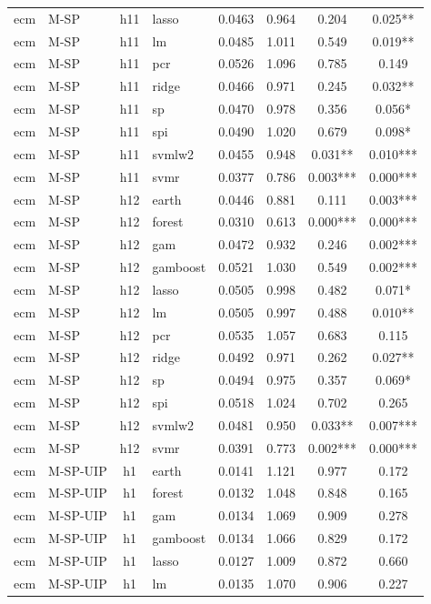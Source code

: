 \begin{ThreePartTable}
\begin{longtable}[t]{llclcccc}
ecm & M-SP & h11 & lasso & 0.0463 & 0.964 & 0.204 & 0.025**\\
ecm & M-SP & h11 & lm & 0.0485 & 1.011 & 0.549 & 0.019**\\
ecm & M-SP & h11 & pcr & 0.0526 & 1.096 & 0.785 & 0.149\\
ecm & M-SP & h11 & ridge & 0.0466 & 0.971 & 0.245 & 0.032**\\
ecm & M-SP & h11 & sp & 0.0470 & 0.978 & 0.356 & 0.056*\\
ecm & M-SP & h11 & spi & 0.0490 & 1.020 & 0.679 & 0.098*\\
ecm & M-SP & h11 & svmlw2 & 0.0455 & 0.948 & 0.031** & 0.010***\\
ecm & M-SP & h11 & svmr & 0.0377 & 0.786 & 0.003*** & 0.000***\\
\addlinespace
ecm & M-SP & h12 & earth & 0.0446 & 0.881 & 0.111 & 0.003***\\
ecm & M-SP & h12 & forest & 0.0310 & 0.613 & 0.000*** & 0.000***\\
ecm & M-SP & h12 & gam & 0.0472 & 0.932 & 0.246 & 0.002***\\
ecm & M-SP & h12 & gamboost & 0.0521 & 1.030 & 0.549 & 0.002***\\
ecm & M-SP & h12 & lasso & 0.0505 & 0.998 & 0.482 & 0.071*\\
ecm & M-SP & h12 & lm & 0.0505 & 0.997 & 0.488 & 0.010**\\
ecm & M-SP & h12 & pcr & 0.0535 & 1.057 & 0.683 & 0.115\\
ecm & M-SP & h12 & ridge & 0.0492 & 0.971 & 0.262 & 0.027**\\
ecm & M-SP & h12 & sp & 0.0494 & 0.975 & 0.357 & 0.069*\\
ecm & M-SP & h12 & spi & 0.0518 & 1.024 & 0.702 & 0.265\\
ecm & M-SP & h12 & svmlw2 & 0.0481 & 0.950 & 0.033** & 0.007***\\
ecm & M-SP & h12 & svmr & 0.0391 & 0.773 & 0.002*** & 0.000***\\
\addlinespace
ecm & M-SP-UIP & h1 & earth & 0.0141 & 1.121 & 0.977 & 0.172\\
ecm & M-SP-UIP & h1 & forest & 0.0132 & 1.048 & 0.848 & 0.165\\
ecm & M-SP-UIP & h1 & gam & 0.0134 & 1.069 & 0.909 & 0.278\\
ecm & M-SP-UIP & h1 & gamboost & 0.0134 & 1.066 & 0.829 & 0.172\\
ecm & M-SP-UIP & h1 & lasso & 0.0127 & 1.009 & 0.872 & 0.660\\
ecm & M-SP-UIP & h1 & lm & 0.0135 & 1.070 & 0.906 & 0.227\\

\end{longtable}
\end{ThreePartTable}
